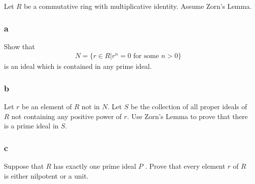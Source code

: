 Let \(R\) be a commutative ring with multiplicative identity. Assume
Zorn's Lemma.

\hypertarget{a-33}{%
\subsubsection{a}\label{a-33}}

Show that
\begin{align*}
N = \{r \in R \mathrel{\Big|}r^n = 0 \text{ for some } n > 0\}
\end{align*}
is an ideal which is contained in any prime ideal.

\hypertarget{b-23}{%
\subsubsection{b}\label{b-23}}

Let \(r\) be an element of \(R\) not in \(N\). Let \(S\) be the
collection of all proper ideals of \(R\) not containing any positive
power of \(r\). Use Zorn's Lemma to prove that there is a prime ideal in
\(S\).

\hypertarget{c-16}{%
\subsubsection{c}\label{c-16}}

Suppose that \(R\) has exactly one prime ideal \(P\) . Prove that every
element \(r\) of \(R\) is either nilpotent or a unit.

